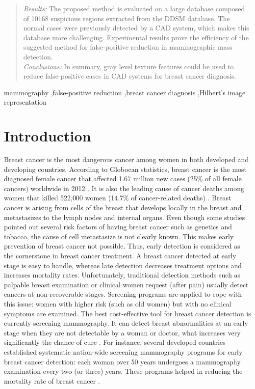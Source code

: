\documentclass[review,12pt]{elsarticle}
\begin{document}
\begin{frontmatter}
\begin{abstract}
\textit{Results:} The proposed method is evaluated on a large database composed of 10168 suspicious regions extracted from the DDSM database. The normal cases were previously detected by a CAD system, which makes this database more challenging. Experimental results prove the efficiency of the suggested method for false-positive reduction in mammographic mass detection.
\\
\textit{Conclusions:}  In summary, gray level texture features could be used to reduce false-positive cases in CAD systems for breast cancer diagnosis.

\end{abstract}

\begin{keyword}
mammography \sep false-positive reduction \sep breast cancer diagnosis \sep Hilbert’s image representation


\end{keyword}

\end{frontmatter}

\section{Introduction}

Breast cancer is the most dangerous cancer among women in both developed and developing countries. According to Globocan statistics, breast cancer is the most diagnosed female cancer that affected 1.67 million new cases (25\% of all female cancers) worldwide in 2012 \citep{Ferlay2012}. It is also the leading cause of cancer deaths among women that killed 522,000 women (14.7\% of cancer-related deaths) \citep{Dhahbi2015}. Breast cancer is arising from cells of the breast that develops locally in the breast and metastasizes to the lymph nodes and internal organs. Even though some studies pointed out several risk factors of having breast cancer such as genetics and tobacco, the cause of cell metastasize is not clearly known. This makes early prevention of breast cancer not possible. Thus, early detection is considered as the cornerstone in breast cancer treatment. A breast cancer detected at early stage is easy to handle, whereas late detection decreases treatment options and increases mortality rates. Unfortunately, traditional detection methods such as palpable breast examination or clinical women request (after pain) usually detect cancers at non-recoverable stages. Screening programs are applied to cope with this issue: women with higher risk (such as old women) but with no clinical symptoms are examined. The best cost-effective tool for breast cancer detection is currently screening mammography. It can detect breast abnormalities at an early stage when they are not detectable by a woman or doctor, what increases very significantly the chance of cure \citep{Jotwani2009}. For instance, several developed countries established systematic nation-wide screening mammography programs for early breast cancer detection: each woman over 50 years undergoes a mammography examination every two (or three) years.  These programs helped in reducing the mortality rate of breast cancer \citep{Nelson2009,Hofvind2009}.
\end{document}
